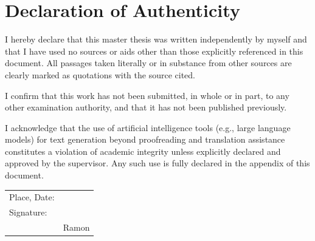\chapter*{Declaration of Authenticity}

I hereby declare that this master thesis was written independently by myself and that I have used no sources or aids other than those explicitly referenced in this document. All passages taken literally or in substance from other sources are clearly marked as quotations with the source cited.

I confirm that this work has not been submitted, in whole or in part, to any other examination authority, and that it has not been published previously.

I acknowledge that the use of artificial intelligence tools (e.g., large language models) for text generation beyond proofreading and translation assistance constitutes a violation of academic integrity unless explicitly declared and approved by the supervisor. Any such use is fully declared in the appendix of this document.

\bigskip\bigskip

\noindent
\begin{tabular}{@{}ll@{}}
Place, Date: & \underline{\hspace{6cm}} \\[1.5em]
Signature:   & \underline{\hspace{6cm}} \\[0.5em]
             & Ramon \\
\end{tabular}
